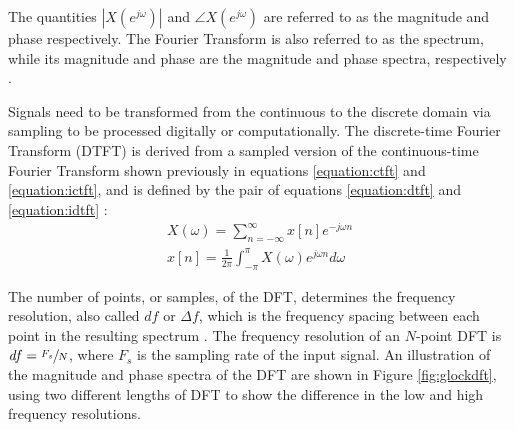 \documentclass[report.tex]{subfiles}
\begin{document}
The quantities $|X(e^{j\omega})|$ and $\angle X(e^{j\omega})$ are referred to as the magnitude and phase respectively. The Fourier Transform is also referred to as the spectrum, while its magnitude and phase are the magnitude and phase spectra, respectively \parencite{discretebook}.

Signals need to be transformed from the continuous to the discrete domain via sampling to be processed digitally or computationally. The discrete-time Fourier Transform (DTFT) is derived from a sampled version of the continuous-time Fourier Transform shown previously in equations \eqref{equation:ctft} and \eqref{equation:ictft}, and is defined by the pair of equations \eqref{equation:dtft} and \eqref{equation:idtft} \parencite[289]{melbook}:
\begin{align}
	X(\omega) = \sum_{n = -\infty}^{\infty}{x[n]e^{-j\omega n}} \tag{5}\label{equation:dtft} \\
	x[n] = \frac{1}{2\pi}\int_{-\pi}^{\pi}{X(\omega)e^{j\omega n}\mathit{d\omega}} \tag{6}\label{equation:idtft}
\end{align}


The number of points, or samples, of the DFT, determines the frequency resolution, also called $\mathit{df}$ or $\mathit{\Delta f}$, which is the frequency spacing between each point in the resulting spectrum \parencite{discretebook}. The frequency resolution of an $N$-point DFT is $\mathit{df} = \sfrac{F_{s}}{N}$, where $F_{s}$ is the sampling rate of the input signal. An illustration of the magnitude and phase spectra of the DFT are shown in Figure \ref{fig:glockdft}, using two different lengths of DFT to show the difference in the low and high frequency resolutions.
\end{document}
